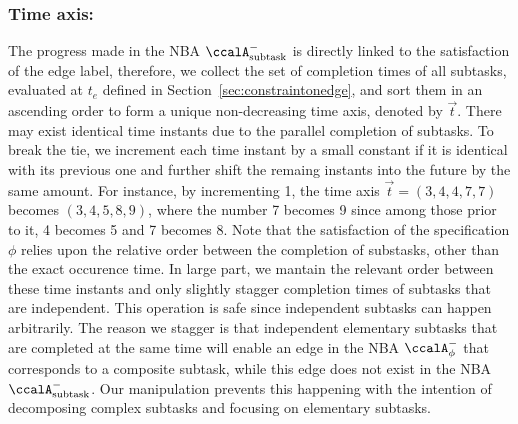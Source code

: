 \documentclass[Afour,sageh,times]{sagej}
\newcommand{\auto}[1]{\ccalA_{\textup{#1}}}
\newcommand{\autop}{\ccalA_{\phi}}
\begin{document}
{{{  \subsubsection{Time axis:} The progress made in the NBA $\auto{subtask}^-$ is directly linked to the satisfaction of the edge label, therefore, we collect the  set of completion times of all subtasks, evaluated at $t_e$ defined in Section~\ref{sec:constraintonedge}, and sort them in an ascending order to form a unique non-decreasing time axis, denoted by $\vec{t}$. There may exist identical time instants due to the parallel completion of subtasks. To break the tie, we increment each time instant by a small constant if it is identical with its previous one and further shift the remaing instants into the future by the same amount. For instance, by incrementing 1, the time axis $\vec{t}= (3, 4, 4, 7, 7)$ becomes $(3, 4, 5, 8, 9)$, where the number 7 becomes 9 since among those prior to it, 4 becomes 5 and 7 becomes 8.  Note that the satisfaction of  the specification $\phi$ relies upon the relative order between the completion of substasks, other than the exact occurence time. In large part, we mantain the relevant order between these time instants and only slightly stagger completion times of subtasks that are independent. This operation is safe since independent subtasks can happen arbitrarily. The reason we stagger is that independent elementary subtasks that are completed at the same time will enable an edge in the NBA $\autop^-$ that corresponds to a composite subtask, while this edge does not exist in the NBA $\auto{subtask}^-$. Our manipulation prevents this happening with the intention of decomposing complex subtasks and focusing on elementary subtasks.

}}}
\end{document}
